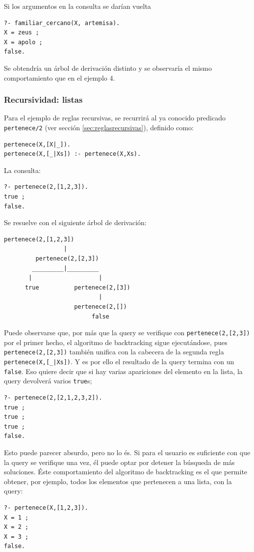 \documentclass[12pt,titlepage]{article}
\begin{document}
Si los argumentos en la consulta se darían vuelta
\begin{lstlisting}
?- familiar_cercano(X, artemisa).
X = zeus ;
X = apolo ;
false.
\end{lstlisting}
Se obtendría un árbol de derivación distinto y se observaría el mismo comportamiento que en el ejemplo 4.

\subsubsection{Recursividad: listas}

Para el ejemplo de reglas recursivas, se recurrirá al ya conocido predicado \lstinline|pertenece/2| (ver sección \ref{sec:reglasrecursivas}), definido como:
\begin{lstlisting}
pertenece(X,[X|_]).
pertenece(X,[_|Xs]) :- pertenece(X,Xs).
\end{lstlisting}

La consulta:
\begin{lstlisting}
?- pertenece(2,[1,2,3]).
true ;
false.
\end{lstlisting}

Se resuelve con el siguiente árbol de derivación:
\begin{Verbatim}[samepage=true,fontsize=\small]
        pertenece(2,[1,2,3])
                 |
         pertenece(2,[2,3])
        _________|_________
       |                   |
      true          pertenece(2,[3])
                           |       
                    pertenece(2,[])
                         false
\end{Verbatim}

Puede observarse que, por más que la query se verifique con \lstinline|pertenece(2,[2,3])| por el primer hecho, el algoritmo de backtracking sigue ejecutándose, pues \lstinline|pertenece(2,[2,3])| también unifica con la cabecera de la segunda regla \lstinline$pertenece(X,[_|Xs])$. Y es por ello el resultado de la query termina con un \lstinline|false|. Eso quiere decir que si hay varias apariciones del elemento en la lista, la query devolverá varios \lstinline|true|s;
\begin{lstlisting}
?- pertenece(2,[2,1,2,3,2]).
true ;
true ;
true ;
false.
\end{lstlisting}

Esto puede parecer absurdo, pero no lo és. Si para el usuario es suficiente con que la query se verifique una vez, él puede optar por detener la búsqueda de más soluciones. Éste comportamiento del algoritmo de backtracking es el que permite obtener, por ejemplo, todos los elementos que pertenecen a una lista, con la query:
\begin{lstlisting}
?- pertenece(X,[1,2,3]).
X = 1 ;
X = 2 ;
X = 3 ;
false.
\end{lstlisting}
\end{document}
